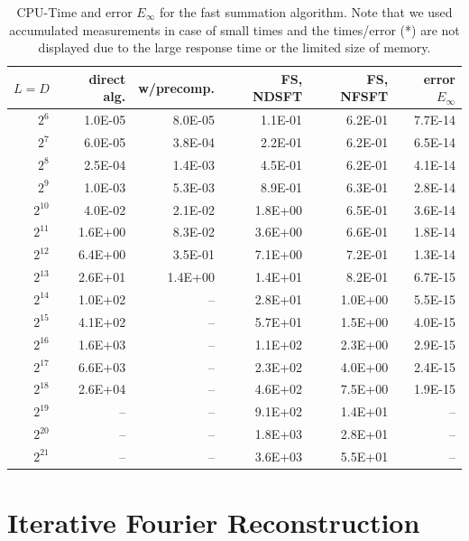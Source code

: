 \begin{table}[ht!]
  \begin{center}
    \begin{tabular}{r|r|r|r|r|r}
        $L = D$ & direct alg. & w/precomp. & FS, NDSFT & FS, NFSFT & error $E_{\infty}$\\\hline
           $2^6$ & 1.0E-05 & 8.0E-05 & 1.1E-01 & 6.2E-01 & 7.7E-14\\
           $2^7$ & 6.0E-05 & 3.8E-04 & 2.2E-01 & 6.2E-01 & 6.5E-14\\
           $2^8$ & 2.5E-04 & 1.4E-03 & 4.5E-01 & 6.2E-01 & 4.1E-14\\
           $2^9$ & 1.0E-03 & 5.3E-03 & 8.9E-01 & 6.3E-01 & 2.8E-14\\
      $2^{10}$ & 4.0E-02 & 2.1E-02 & 1.8E+00 & 6.5E-01 & 3.6E-14\\
      $2^{11}$ & 1.6E+00 & 8.3E-02 & 3.6E+00 & 6.6E-01 & 1.8E-14\\
      $2^{12}$ & 6.4E+00 & 3.5E-01 & 7.1E+00 & 7.2E-01 & 1.3E-14\\
      $2^{13}$ & 2.6E+01 & 1.4E+00 & 1.4E+01 & 8.2E-01 & 6.7E-15\\
     $2^{14}$ & 1.0E+02 & -- & 2.8E+01 & 1.0E+00 & 5.5E-15\\
     $2^{15}$ & 4.1E+02 & -- & 5.7E+01 & 1.5E+00 & 4.0E-15\\
     $2^{16}$ & 1.6E+03 & -- & 1.1E+02 & 2.3E+00 & 2.9E-15\\
     $2^{17}$ & 6.6E+03 & -- & 2.3E+02 & 4.0E+00 & 2.4E-15\\
     $2^{18}$ & 2.6E+04 & -- & 4.6E+02 & 7.5E+00 & 1.9E-15\\
     $2^{19}$ & -- & -- & 9.1E+02 & 1.4E+01 & --\\
     $2^{20}$ & -- & -- & 1.8E+03 & 2.8E+01 & --\\
     $2^{21}$ & -- & -- & 3.6E+03 & 5.5E+01 & --\\
    \end{tabular}
  \end{center}
  \caption{CPU-Time and error $E_{\infty}$ for the fast summation algorithm.
    Note that we used accumulated measurements in case of small times and the
    times/error (*) are not displayed due to the large response time or the 
    limited size of memory.}
  \label{tab:TimeSpace}
\end{table}


\section{Iterative Fourier Reconstruction}

